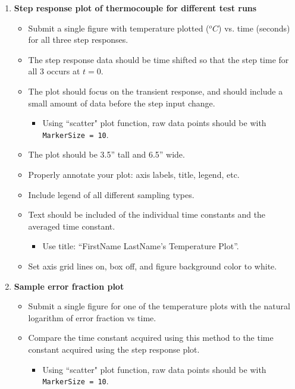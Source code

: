 \documentclass{article} %
\begin{document}
\begin{enumerate}
    \item \textbf{Step response plot of thermocouple for different test runs}
    \begin{itemize}
        \item Submit a single figure with temperature plotted ($^{o}C$) vs. time (seconds) for all three step responses.
        \item The step response data should be time shifted so that the step time for all 3 occurs at $t=0$.
        \item The plot should focus on the transient response, and should include a small amount of data before the step input change.
        \begin{itemize}
            \item Using ``scatter" plot function, raw data points should be with \texttt{MarkerSize = 10}.
        \end{itemize} 
        \item The plot should be 3.5'' tall and 6.5'' wide.
        \item Properly annotate your plot: axis labels, title, legend, etc.
        \item Include legend of all different sampling types.
        \item Text should be included of the individual time constants and the averaged time constant.
        \begin{itemize}
            \item Use title: ``FirstName LastName's Temperature Plot''.
        \end{itemize}
        \item Set axis grid lines on, box off, and figure background color to white.
    \end{itemize}
    \item \textbf{Sample error fraction plot} 
    \begin{itemize}
        \item Submit a single figure for one of the temperature plots  with the natural logarithm of error fraction vs time.
        \item Compare the time constant acquired using this method to the time constant acquired using the step response plot.
        \begin{itemize}
            \item Using ``scatter" plot function, raw data points should be with \texttt{MarkerSize = 10}.
        \end{itemize} 

\end{itemize}
\end{enumerate}
\end{document}

